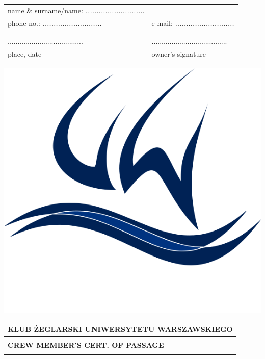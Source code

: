 \documentclass{article}
\begin{document}
\begin{tabularx}{\textwidth}{X X}
name \& surname/name: \textit{...........................} \\
phone no.: \textit{...........................} & e-mail: \textit{...........................}\\
\\\\
...................................... & ......................................\\
place, date & owner's signature\\
\end{tabularx}
\newpage
\begin{minipage}{0.11\textwidth}
\includegraphics[width=\textwidth]{logo.png}
\end{minipage}
\begin{minipage}{0.89\textwidth}
\begin{tabularx}{\textwidth} { 
  | >{\centering\arraybackslash}X | }
 \hline
 \textbf{KLUB ŻEGLARSKI UNIWERSYTETU WARSZAWSKIEGO} \\
 \hline
 \\
 \textbf{\huge CREW MEMBER'S CERT. OF PASSAGE} \\
 \\
\hline
\end{tabularx}
\end{minipage}
\end{document}
